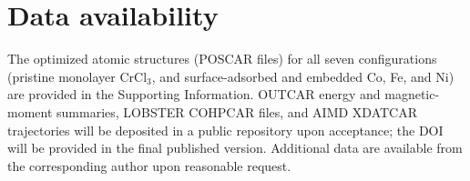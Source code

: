 \documentclass[journal=jacsat,manuscript=article]{achemso}
\begin{document}
\section*{Data availability}

{\color{revcolor}%
  The optimized atomic structures (POSCAR files) for all seven configurations (pristine monolayer CrCl$_3$, and surface-adsorbed and embedded Co, Fe, and Ni) are provided in the Supporting Information. OUTCAR energy and magnetic-moment summaries, LOBSTER COHPCAR files, and AIMD XDATCAR trajectories will be deposited in a public repository upon acceptance; the DOI will be provided in the final published version. Additional data are available from the corresponding author upon reasonable request.
\par}

\nolinenumbers

\end{document}
